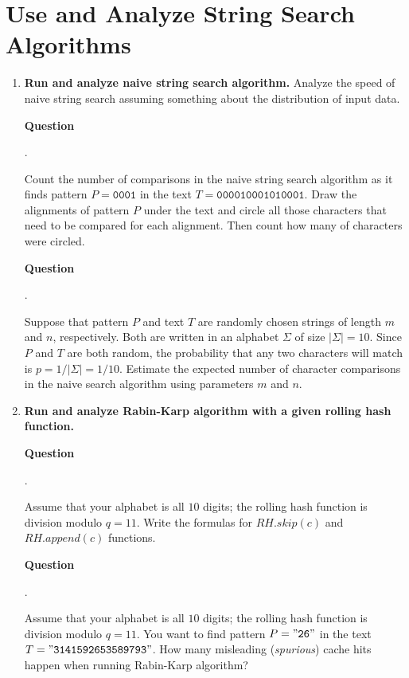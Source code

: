 \documentclass[a4paper,12pt]{article}
\newcounter{mcounter}
\newcommand\showmcounter{\addtocounter{mcounter}{1}\themcounter}
\begin{document}
{\begin{enumerate}[label=3.\Alph*.]
\end{enumerate}


\section{Use and Analyze String Search Algorithms}
\setcounter{mcounter}{0}

\begin{enumerate}[label=4.\Alph*.]
\item {\bf Run and analyze naive string search algorithm.} 
Analyze the speed of naive string search assuming something about the
distribution of input data. 

\vspace{10pt}
{\bf Question \showmcounter.}
Count the number of comparisons in the naive string search algorithm 
as it finds pattern $P = \mathtt{0001}$ in the text $T = \mathtt{000010001010001}$. 
Draw the alignments of pattern $P$ under the text and circle all those characters
that need to be compared for each alignment. 
Then count how many of characters were circled.

\vspace{10pt}
{\bf Question \showmcounter.}
Suppose that pattern $P$ and text $T$ are randomly chosen strings of length $m$ and $n$,
respectively. Both are written in an alphabet $\Sigma$ of size $|\Sigma| = 10$. 
Since $P$ and $T$ are both random, the probability that any two characters will match is
$p =  1/|\Sigma| = 1/10$. Estimate the expected number of character comparisons in the 
naive search algorithm using parameters $m$ and $n$.





\item {\bf Run and analyze Rabin-Karp algorithm with a given rolling hash function.}

\vspace{10pt}
{\bf Question \showmcounter.}
Assume that your alphabet is all $10$ digits; 
the rolling hash function is division modulo $q = 11$. 
Write the formulas for $RH.skip(c)$ and $RH.append(c)$ functions.

\vspace{10pt}
{\bf Question \showmcounter.}
Assume that your alphabet is all $10$ digits; 
the rolling hash function is division modulo $q = 11$. 
You want to find pattern $P = \mathtt{"26"}$ in the text
$T = \mathtt{"3141592653589793"}$. 
How many misleading ({\em spurious}) cache hits happen when 
running Rabin-Karp algorithm?






\end{enumerate}}
\end{document}
